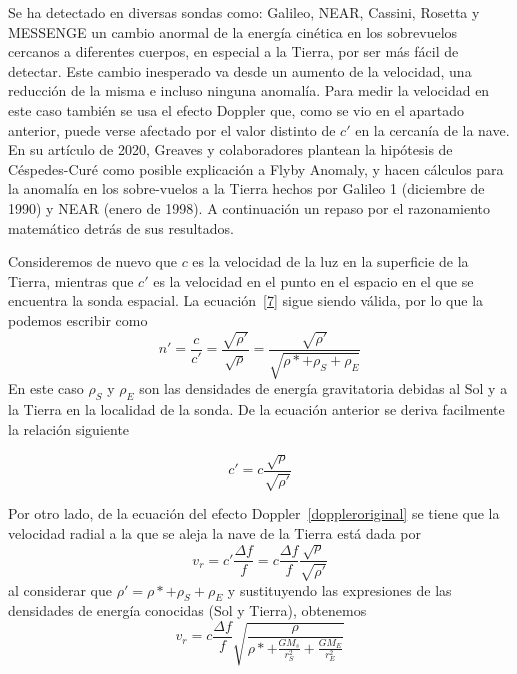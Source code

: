 Se ha detectado en diversas sondas como: Galileo, NEAR, Cassini, Rosetta y MESSENGE \cite{Anderson2008flyby} un cambio anormal de la energía cinética en los sobrevuelos cercanos a diferentes cuerpos, en especial a la Tierra, por ser más fácil de detectar. Este cambio inesperado va desde un aumento de la velocidad, una reducción de la misma e incluso ninguna anomalía. Para medir la velocidad en este caso también se usa el efecto Doppler que, como se vio en el apartado anterior, puede verse afectado por el valor distinto de $c'$ en la cercanía de la nave. En su artículo de 2020, Greaves y colaboradores \cite{Greavesflyby} plantean la hipótesis de Céspedes-Curé como posible explicación a Flyby Anomaly, y hacen cálculos para la anomalía en los sobre-vuelos a la Tierra hechos por Galileo 1 (diciembre de 1990) y NEAR (enero de 1998). A continuación un repaso por el razonamiento matemático detrás de sus resultados.

Consideremos de nuevo que $c$ es la velocidad de la luz en la superficie de la Tierra, mientras que $c'$ es la velocidad en el punto en el espacio en el que se encuentra la sonda espacial. La ecuación~\ref{7} sigue siendo válida, por lo que la podemos escribir como
\begin{equation} \label{n'flyby}
    n'=\frac{c}{c'}=\frac{\sqrt{\rho'}}{\sqrt{\rho}}=\frac{\sqrt{\rho'}}{\sqrt{\rho*+\rho_S+\rho_E}}
\end{equation}
 En este caso $\rho_S$ y $\rho_E$ son las densidades de energía gravitatoria debidas al Sol y a la Tierra en la localidad de la sonda. De la ecuación anterior se deriva facilmente la relación siguiente

\begin{equation} \label{relacionc'conc}
    c'= c \frac{\sqrt{\rho}}{\sqrt{\rho'}}    
\end{equation}

Por otro lado, de la ecuación del efecto Doppler~\ref{doppleroriginal} se tiene que la velocidad radial a la que se aleja la nave de la Tierra está dada por
\begin{equation}
    v_r = c' \frac{\Delta f}{f} = c \frac{\Delta f}{f}\frac{\sqrt{\rho}}{\sqrt{\rho'}}   
\end{equation}
 al considerar que $\rho'=\rho*+\rho_S+\rho_E$ y sustituyendo las expresiones de las densidades de energía conocidas (Sol y Tierra), obtenemos
 \begin{equation} \label{velocidadrflyby}
      v_r = c \frac{\Delta f}{f} \sqrt{\frac{\rho}{\rho*+\frac{G M_s}{r_S^2} + \frac{GM_E}{r_E^2}} }
 \end{equation}

